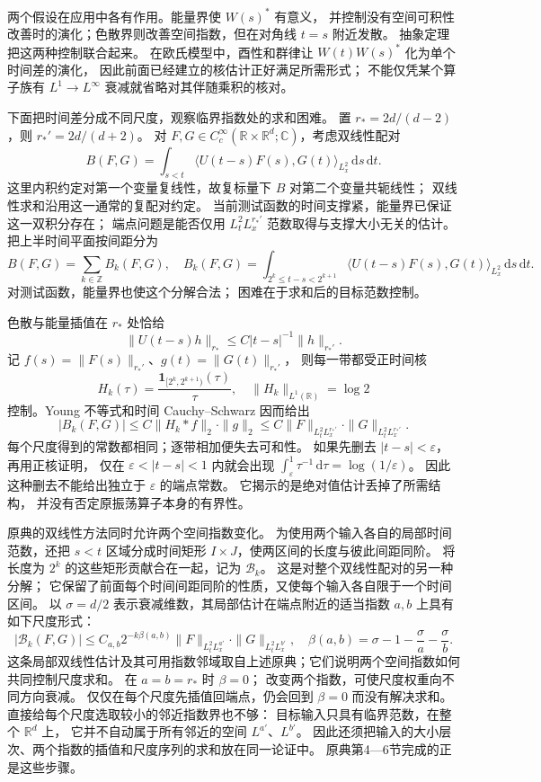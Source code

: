 两个假设在应用中各有作用。能量界使 \(W(s)^*\) 有意义，
并控制没有空间可积性改善时的演化；色散界则改善空间指数，但在对角线 \(t=s\) 附近发散。
抽象定理把这两种控制联合起来。
在欧氏模型中，酉性和群律让 \(W(t)W(s)^*\) 化为单个时间差的演化，
因此前面已经建立的核估计正好满足所需形式；
不能仅凭某个算子族有 \(L^1\to L^\infty\) 衰减就省略对其伴随乘积的核对。

\ProseParagraphBreak
下面把时间差分成不同尺度，观察临界指数处的求和困难。
置 \(r_*=2d/(d-2)\)，则 \(r_*'=2d/(d+2)\)。
对 \(F,G\in C_c^\infty(\mathbb R\times\mathbb R^d;\mathbb C)\)，考虑双线性配对
\[
 B(F,G)=\int_{s<t}
 \langle U(t-s)F(s),G(t)\rangle_{L^2_x}\,\mathrm ds\,\mathrm dt.
\]
这里内积约定对第一个变量复线性，故复标量下 \(B\) 对第二个变量共轭线性；
双线性求和沿用这一通常的复配对约定。
当前测试函数的时间支撑紧，能量界已保证这一双积分存在；
端点问题是能否仅用
\(L^2_tL^{r_*'}_x\) 范数取得与支撑大小无关的估计。
把上半时间平面按间距分为
\[
 B(F,G)=\sum_{k\in\mathbb Z}B_k(F,G),
 \quad
 B_k(F,G)=
 \int_{2^k\le t-s<2^{k+1}}
 \langle U(t-s)F(s),G(t)\rangle_{L^2_x}\,\mathrm ds\,\mathrm dt.
\]
对测试函数，能量界也使这个分解合法；
困难在于求和后的目标范数控制。

\ProseParagraphBreak
色散与能量插值在 \(r_*\) 处恰给
\[
 \|U(t-s)h\|_{r_*}\le C|t-s|^{-1}\|h\|_{r_*'}.
\]
记 \(f(s)=\|F(s)\|_{r_*'}\)、\(g(t)=\|G(t)\|_{r_*'}\)，
则每一带都受正时间核
\[
 H_k(\tau)=\frac{\mathbf1_{[2^k,2^{k+1})}(\tau)}{\tau},
 \quad
 \|H_k\|_{L^1(\mathbb R)}=\log2
\]
控制。Young 不等式和时间 Cauchy--Schwarz 因而给出
\[
 |B_k(F,G)|
 \le C\|H_k*f\|_2\cdot\|g\|_2
 \le C\|F\|_{L^2_tL^{r_*'}_x}
        \cdot\|G\|_{L^2_tL^{r_*'}_x}.
\]
每个尺度得到的常数都相同；逐带相加便失去可和性。
如果先删去 \(|t-s|<\varepsilon\)，再用正核证明，
仅在 \(\varepsilon<|t-s|<1\) 内就会出现
\(\int_\varepsilon^1\tau^{-1}\,\mathrm d\tau=\log(1/\varepsilon)\)。
因此这种删去不能给出独立于 \(\varepsilon\) 的端点常数。
它揭示的是绝对值估计丢掉了所需结构，
并没有否定原振荡算子本身的有界性。

\ProseParagraphBreak
原典的双线性方法同时允许两个空间指数变化。
为使用两个输入各自的局部时间范数，还把 \(s<t\) 区域分成时间矩形
\(I\times J\)，使两区间的长度与彼此间距同阶。
将长度为 \(2^k\) 的这些矩形贡献合在一起，记为 \(\mathcal B_k\)。
这是对整个双线性配对的另一种分解；
它保留了前面每个时间间距同阶的性质，又使每个输入各自限于一个时间区间。
以 \(\sigma=d/2\) 表示衰减维数，其局部估计在端点附近的适当指数
\(a,b\) 上具有如下尺度形式：
\[
 |\mathcal B_k(F,G)|
 \le C_{a,b}2^{-k\beta(a,b)}
       \|F\|_{L^2_tL^{a'}_x}
       \cdot\|G\|_{L^2_tL^{b'}_x},
 \quad
 \beta(a,b)=\sigma-1-\frac{\sigma}{a}-\frac{\sigma}{b}.
\]
这条局部双线性估计及其可用指数邻域取自上述原典；它们说明两个空间指数如何共同控制尺度求和。
在 \(a=b=r_*\) 时 \(\beta=0\)；
改变两个指数，可使尺度权重向不同方向衰减。
仅仅在每个尺度先插值回端点，仍会回到 \(\beta=0\) 而没有解决求和。
直接给每个尺度选取较小的邻近指数界也不够：
目标输入只具有临界范数，在整个 \(\mathbb R^d\) 上，
它并不自动属于所有邻近的空间 \(L^{a'}\)、\(L^{b'}\)。
因此还须把输入的大小层次、两个指数的插值和尺度序列的求和放在同一论证中。
原典第4—6节完成的正是这些步骤。

